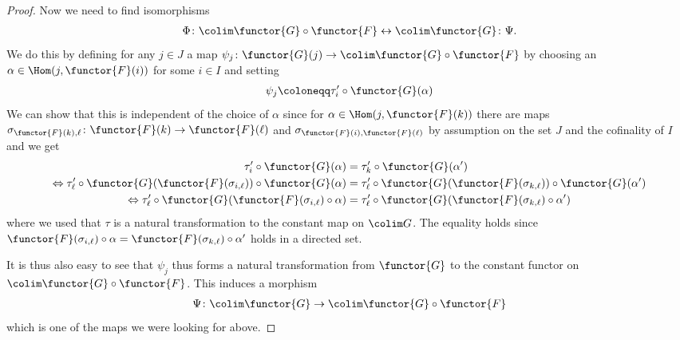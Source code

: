 \begin{proof}
  Now we need to find isomorphisms
  \begin{align*}
    \Phi \colon \colim \functor{G} \circ \functor{F} \leftrightarrow
    \colim \functor{G} \colon \Psi.
  \end{align*}
  We do this by defining for any $j\in J$ a map $\psi_j \colon
  \functor{G}(j)\rightarrow \colim \functor{G} \circ \functor{F}$ by
  choosing an $\alpha \in \Hom (j, \functor{F}(i) ) $ for some $ i\in I$
  and setting
  \begin{align*}
    \psi_j \coloneqq \tau_{i}'\circ \functor{G}(\alpha)
  \end{align*}
  We can show that this is independent of the choice of $\alpha$ since
  for $\alpha \in \Hom(j, \functor{F}(k))$ there are maps $\sigma_{\functor{F}(k),
    \ell}\colon \functor{F}(k) \rightarrow \functor{F}(\ell)$ and $\sigma_{\functor{F}(i), \functor{F}(\ell)}$ by
  assumption on the set $J$ and the cofinality of $I$ and we get
  \begin{align*}
    \tau_{i}'\circ \functor{G} ( \alpha ) &=
                                                        \tau_{k}'\circ
                                                        \functor{G} (
                                                        \alpha' )
    \\
    \Leftrightarrow \tau_{\ell}' \circ
    \functor{G}(\functor{F}(\sigma_{i,\ell})) \circ
    \functor{G}(\alpha)
                                                      &= \tau_{\ell}' \circ
                                                        \functor{G}(\functor{F}(\sigma_{k,\ell}))\circ
                                                        \functor{G}(\alpha')
    \\
    \Leftrightarrow \tau_{\ell}' \circ
    \functor{G}(\functor{F}(\sigma_{i,\ell}) \circ\alpha)
                                                      &= \tau_{\ell}' \circ
                                                        \functor{G}(\functor{F}(\sigma_{k,\ell})\circ
                                                        \alpha')
  \end{align*}
  where we used that $\tau$ is a natural transformation to the
  constant map on $\colim G$. The equality holds since
  $\functor{F}(\sigma_{i,\ell})\circ \alpha =
  \functor{F}(\sigma_{k,\ell}) \circ\alpha'$ holds in a
  directed set.
  
  It is thus also easy to see that $\psi_j$ thus forms a natural
  transformation from $\functor{G} $ to the constant
  functor on $\colim \functor{G}\circ \functor{F}$. This induces a morphism
  \begin{align*}
    \Psi \colon \colim \functor{G} \rightarrow \colim \functor{G}\circ \functor{F}
  \end{align*}
  which is one of the maps we were looking for above.


\end{proof}
